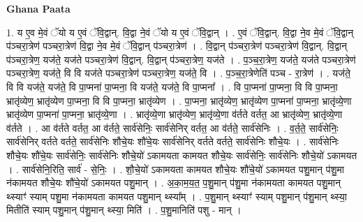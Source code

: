 \documentclass[17pt]{extarticle}
\begin{document}
\textbf{Ghana Paata } \newline

1. य ए॒व मे॒वं ॅयो य ए॒वं ॅवि॒द्वान्. वि॒द्वा ने॒वं ॅयो य ए॒वं ॅवि॒द्वान् । . ए॒वं ॅवि॒द्वान्. वि॒द्वा ने॒व मे॒वं ॅवि॒द्वान् प॑ञ्चरा॒त्रेण॑ पञ्चरा॒त्रेण॑ वि॒द्वा ने॒व मे॒वं ॅवि॒द्वान् प॑ञ्चरा॒त्रेण॑ । . वि॒द्वान् प॑ञ्चरा॒त्रेण॑ पञ्चरा॒त्रेण॑ वि॒द्वान्. वि॒द्वान् प॑ञ्चरा॒त्रेण॒ यज॑ते॒ यज॑ते पञ्चरा॒त्रेण॑ वि॒द्वान्. वि॒द्वान् प॑ञ्चरा॒त्रेण॒ यज॑ते । . प॒ञ्च॒रा॒त्रेण॒ यज॑ते॒ यज॑ते पञ्चरा॒त्रेण॑ पञ्चरा॒त्रेण॒ यज॑ते॒ वि वि यज॑ते पञ्चरा॒त्रेण॑ पञ्चरा॒त्रेण॒ यज॑ते॒ वि । . प॒ञ्च॒रा॒त्रेणेति॑ पञ्च - रा॒त्रेण॑ । . यज॑ते॒ वि वि यज॑ते॒ यज॑ते॒ वि पा॒प्मना॑ पा॒प्मना॒ वि यज॑ते॒ यज॑ते॒ वि पा॒प्मना᳚ । . वि पा॒प्मना॑ पा॒प्मना॒ वि वि पा॒प्मना॒ भ्रातृ॑व्येण॒ भ्रातृ॑व्येण पा॒प्मना॒ वि वि पा॒प्मना॒ भ्रातृ॑व्येण । . पा॒प्मना॒ भ्रातृ॑व्येण॒ भ्रातृ॑व्येण पा॒प्मना॑ पा॒प्मना॒ भ्रातृ॑व्ये॒णा भ्रातृ॑व्येण पा॒प्मना॑ पा॒प्मना॒ भ्रातृ॑व्ये॒णा । . भ्रातृ॑व्ये॒णा भ्रातृ॑व्येण॒ भ्रातृ॑व्ये॒णा व॑र्तते वर्तत॒ आ भ्रातृ॑व्येण॒ भ्रातृ॑व्ये॒णा व॑र्तते । . आ व॑र्तते वर्तत॒ आ व॑र्तते॒ सार्व॑सेनिः॒ सार्व॑सेनिर् वर्तत॒ आ व॑र्तते॒ सार्व॑सेनिः । . व॒र्त॒ते॒ सार्व॑सेनिः॒ सार्व॑सेनिर् वर्तते वर्तते॒ सार्व॑सेनिः शौचे॒यः शौ॑चे॒यः सार्व॑सेनिर् वर्तते वर्तते॒ सार्व॑सेनिः शौचे॒यः । . सार्व॑सेनिः शौचे॒यः शौ॑चे॒यः सार्व॑सेनिः॒ सार्व॑सेनिः शौचे॒यो॑ ऽकामयता कामयत शौचे॒यः सार्व॑सेनिः॒ सार्व॑सेनिः शौचे॒यो॑ ऽकामयत । . सार्व॑सेनि॒रिति॒ सार्व॑ - से॒निः॒ । . शौ॒चे॒यो॑ ऽकामयता कामयत शौचे॒यः शौ॑चे॒यो॑ ऽकामयत पशु॒मान् प॑शु॒मा न॑कामयत शौचे॒यः शौ॑चे॒यो॑ ऽकामयत पशु॒मान् । . अ॒का॒म॒य॒त॒ प॒शु॒मान् प॑शु॒मा न॑कामयता कामयत पशु॒मान् थ्स्याꣳ॑ स्याम् पशु॒मा न॑कामयता कामयत पशु॒मान् थ्स्या᳚म् । . प॒शु॒मान् थ्स्याꣳ॑ स्याम् पशु॒मान् प॑शु॒मान् थ्स्या॒ मितीति॑ स्याम् पशु॒मान् प॑शु॒मान् थ्स्या॒ मिति॑ । . प॒शु॒मानिति॑ पशु - मान् । \newline
\end{document}

